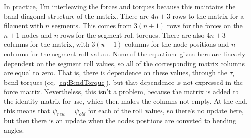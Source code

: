 \documentclass {scrbook}
\begin{document}
In practice, I'm interleaving the forces and torques because this maintains the band-diagonal structure of the matrix. There are $4n+3$ rows to the matrix for a filament with $n$ segments. This comes from $3(n+1)$ rows for the forces on the $n+1$ nodes and $n$ rows for the segment roll torques. There are also $4n+3$ columns for the matrix, with $3(n+1)$ columns for the node positions and $n$ columns for the segment roll values. None of the equations given here are linearly dependent on the segment roll values, so all of the corresponding matrix columns are equal to zero. That is, there is dependence on these values, through the $\tau_i$ bend torques (eq. \ref{eq:BendTorque}), but that dependence is not expressed in the force matrix. Nevertheless, this isn't a problem, because the matrix is added to the identity matrix for use, which then makes the columns not empty. At the end, this means that $\psi_{new}=\psi_{old}$ for each of the roll values, so there's no update here, but then there is an update when the nodes positions are conveted to bending angles.
\end{document}
